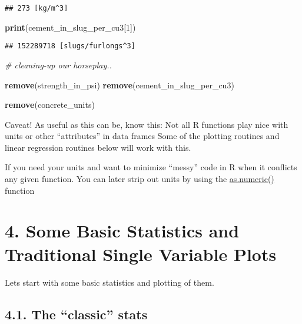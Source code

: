 \documentclass[]{article}
\newenvironment{Shaded}{\begin{snugshade}}{\end{snugshade}}
\newcommand{\CommentTok}[1]{\textcolor[rgb]{0.56,0.35,0.01}{\textit{#1}}}
\newcommand{\DecValTok}[1]{\textcolor[rgb]{0.00,0.00,0.81}{#1}}
\newcommand{\KeywordTok}[1]{\textcolor[rgb]{0.13,0.29,0.53}{\textbf{#1}}}
\newcommand{\NormalTok}[1]{#1}
\begin{document}
\begin{verbatim}
## 273 [kg/m^3]
\end{verbatim}

\begin{Shaded}
\begin{Highlighting}[]
  \KeywordTok{print}\NormalTok{(cement_in_slug_per_cu3[}\DecValTok{1}\NormalTok{])}
\end{Highlighting}
\end{Shaded}

\begin{verbatim}
## 152289718 [slugs/furlongs^3]
\end{verbatim}

\begin{Shaded}
\begin{Highlighting}[]
  \CommentTok{# cleaning-up our horseplay..}
  
  \KeywordTok{remove}\NormalTok{(strength_in_psi)}
  \KeywordTok{remove}\NormalTok{(cement_in_slug_per_cu3)}
  
  \KeywordTok{remove}\NormalTok{(concrete_units)}
\end{Highlighting}
\end{Shaded}

Caveat! As useful as this can be, know this: Not all R functions play
nice with units or other ``attributes'' in data frames Some of the
plotting routines and linear regression routines below will work with
this.

If you need your units and want to minimize ``messy'' code in R when it
conflicts any given function. You can later strip out units by using the
\href{https://www.rdocumentation.org/packages/base/versions/3.5.1/topics/numeric}{as.numeric()}
function

\hypertarget{some-basic-statistics-and-traditional-single-variable-plots}{%
\section{4. Some Basic Statistics and Traditional Single Variable
Plots}\label{some-basic-statistics-and-traditional-single-variable-plots}}

Lets start with some basic statistics and plotting of them.

\hypertarget{the-classic-stats}{%
\subsection{4.1. The ``classic'' stats}\label{the-classic-stats}}
\end{document}
